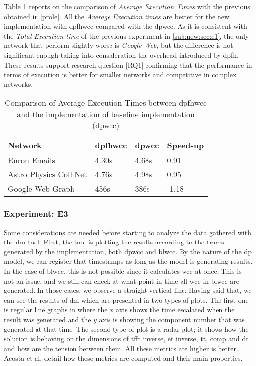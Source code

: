 Table \ref{table:new:6} reports on the comparison of \textit{Average Execution Times} with the previous obtained in \autoref{prole}. All the \textit{Average Execution times} are better for the new implementation with \acrshort{dpfhwcc} compared with the \acrshort{dpwcc}.
As it is consistent with the \textit{Total Execution time} of the previous experiment in \autoref{sub:new:sec:e1}, the only network that perform slightly worse is \textit{Google Web}, but the difference is not significant enough taking into consideration the overhead introduced by \acrshort{dpfh}.
These results support research question [RQ1] confirming that the performance in terms of execution is better for smaller networks and competitive in complex networks. 

 \begin{table}[H]
  \centering
  \begin{tabular}{|l|l|l|l|}
   \hline
   \textbf{Network} & \textbf{\acrshort{dpfhwcc}} & \textbf{\acrshort{dpwcc}} & \textbf{Speed-up}\\
   \hline
   Enron Emails & 4.30s & 4.68s &  0.91\\
   \hline
   Astro Physics Coll Net & 4.76s  & 4.98s & 0.95\\
   \hline
   Google Web Graph & 456s & 386s & -1.18\\
   \hline
  \end{tabular}
 \caption{Comparison of Average Execution Times between \acrshort{dpfhwcc} and the implementation of baseline implementation (\acrshort{dpwcc})}
 \label{table:new:6}
 \end{table}



\subsubsection{Experiment: E3}\label{sub:new:sec:e2}

Some considerations are needed before starting to analyze the data gathered with the \acrshort{dm} tool. 
First, the tool is plotting the results according to the traces generated by the implementation, both \acrshort{dpwcc} and \acrshort{blwcc}. 
By the nature of the \acrshort{dp} model, we can register that timestamps as long as the model is generating results. 
In the case of \acrshort{blwcc}, this is not possible since it calculates \acrshort{wcc} at once. 
This is not an issue, and we still can check at what point in time all \acrshort{wcc} in \acrshort{blwcc} are generated. In those cases, we observe a straight vertical line. 
Having said that, we can see the results of \acrshort{dm} which are presented in two types of plots. 
The first one is regular line graphs in where the $x$ axis shows the time escalated when the result was generated and the $y$ axis is showing the component number that was generated at that time. The second type of plot is a radar plot; it shows how the solution is behaving on the dimensions of  \acrfull{tfft} inverse, \acrfull{et} inverse, \acrfull{tt}, \acrfull{comp} and \acrfull{dt} and how are the tension between them. All these metrics are higher is better. Acosta et al. \cite{diefpaper} detail how these metrics are computed and their main properties.


